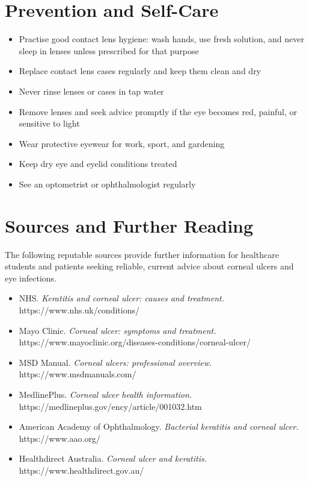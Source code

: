 \section*{Prevention and Self-Care}
\begin{itemize}
    \item Practise good contact lens hygiene: wash hands, use fresh solution, and never sleep in lenses unless prescribed for that purpose
    \item Replace contact lens cases regularly and keep them clean and dry
    \item Never rinse lenses or cases in tap water
    \item Remove lenses and seek advice promptly if the eye becomes red, painful, or sensitive to light
    \item Wear protective eyewear for work, sport, and gardening
    \item Keep dry eye and eyelid conditions treated
    \item See an optometrist or ophthalmologist regularly
\end{itemize}

\section*{Sources and Further Reading}
The following reputable sources provide further information for healthcare students and patients seeking reliable, current advice about corneal ulcers and eye infections.

\begin{itemize}
    \item NHS. \textit{Keratitis and corneal ulcer: causes and treatment.} https://www.nhs.uk/conditions/
    \item Mayo Clinic. \textit{Corneal ulcer: symptoms and treatment.} https://www.mayoclinic.org/diseases-conditions/corneal-ulcer/
    \item MSD Manual. \textit{Corneal ulcers: professional overview.} https://www.msdmanuals.com/
    \item MedlinePlus. \textit{Corneal ulcer health information.} https://medlineplus.gov/ency/article/001032.htm
    \item American Academy of Ophthalmology. \textit{Bacterial keratitis and corneal ulcer.} https://www.aao.org/
    \item Healthdirect Australia. \textit{Corneal ulcer and keratitis.} https://www.healthdirect.gov.au/
\end{itemize}
